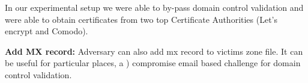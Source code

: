 In our experimental setup we were able to by-pass domain control validation and were able to obtain certificates from two top Certificate Authorities (Let's encrypt and Comodo). %

\textbf{ Add MX record:} 
Adversary can also add mx record to victims zone file. It can be useful for particular places, a ) compromise email based challenge for domain control validation. %


